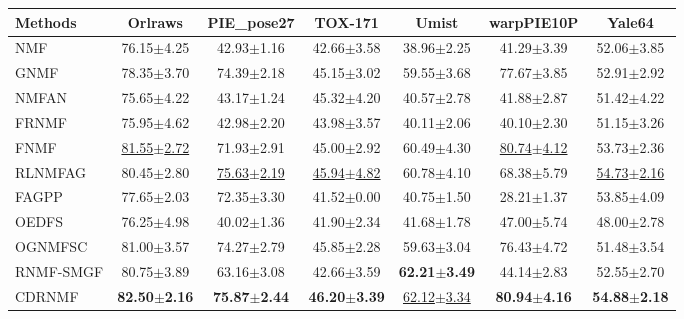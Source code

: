\documentclass[a4paper,fleqn]{cas-sc}
\begin{document}
\begin{table}[htbp]
{\begin{tabular}{lcccccc}
		\textbf{Methods} & \textbf{Orlraws} & \textbf{PIE\_pose27} & \textbf{TOX-171} & \textbf{Umist} & \textbf{warpPIE10P} & \textbf{Yale64} \\
		\hline
		NMF & 76.15$\pm$4.25 & 42.93$\pm$1.16 & 42.66$\pm$3.58 & 38.96$\pm$2.25 & 41.29$\pm$3.39 & 52.06$\pm$3.85 \\
		GNMF & 78.35$\pm$3.70 & 74.39$\pm$2.18 & 45.15$\pm$3.02 & 59.55$\pm$3.68 & 77.67$\pm$3.85 & 52.91$\pm$2.92 \\
		NMFAN & 75.65$\pm$4.22 & 43.17$\pm$1.24 & 45.32$\pm$4.20 & 40.57$\pm$2.78 & 41.88$\pm$2.87 & 51.42$\pm$4.22 \\
		FRNMF & 75.95$\pm$4.62 & 42.98$\pm$2.20 & 43.98$\pm$3.57 & 40.11$\pm$2.06 & 40.10$\pm$2.30 & 51.15$\pm$3.26 \\
		FNMF & \underline{81.55$\pm$2.72} & 71.93$\pm$2.91 & 45.00$\pm$2.92 & 60.49$\pm$4.30 & \underline{80.74$\pm$4.12} & 53.73$\pm$2.36 \\
		RLNMFAG & 80.45$\pm$2.80 & \underline{75.63$\pm$2.19} & \underline{45.94$\pm$4.82} & 60.78$\pm$4.10 & 68.38$\pm$5.79 & \underline{54.73$\pm$2.16} \\
		FAGPP & 77.65$\pm$2.03 & 72.35$\pm$3.30 & 41.52$\pm$0.00 & 40.75$\pm$1.50 & 28.21$\pm$1.37 & 53.85$\pm$4.09 \\
		OEDFS & 76.25$\pm$4.98 & 40.02$\pm$1.36 & 41.90$\pm$2.34 & 41.68$\pm$1.78 & 47.00$\pm$5.74 & 48.00$\pm$2.78 \\
		OGNMFSC & 81.00$\pm$3.57 & 74.27$\pm$2.79 & 45.85$\pm$2.28 & 59.63$\pm$3.04 & 76.43$\pm$4.72 & 51.48$\pm$3.54 \\
		RNMF-SMGF & 80.75$\pm$3.89 & 63.16$\pm$3.08 & 42.66$\pm$3.59 & \textbf{62.21$\pm$3.49} & 44.14$\pm$2.83 & 52.55$\pm$2.70 \\
		CDRNMF & \textbf{82.50$\pm$2.16} & \textbf{75.87$\pm$2.44} & \textbf{46.20$\pm$3.39} & \underline{62.12$\pm$3.34} & \textbf{80.94$\pm$4.16} & \textbf{54.88$\pm$2.18} \\
		\hline
	\end{tabular}
}
	\label{tab:comparison}
\end{table}
\end{document}
